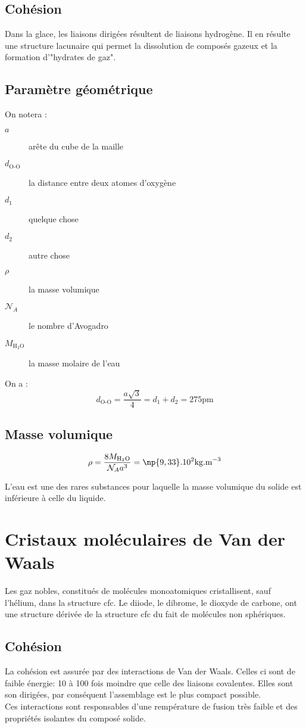 \subsection{Cohésion}
Dans la glace, les liaisons dirigées résultent de liaisons
hydrogène. Il en résulte une structure lacunaire qui permet
la dissolution de composés gazeux et la formation
d’"hydrates de gaz".

\subsection{Paramètre géométrique}
On notera :
\begin{description}
    \item[$a$] arête du cube de la maille
    \item[$d_\text{O-O}$] la distance entre deux atomes
        d'oxygène
    \item[$d_1$] quelque chose
    \item[$d_2$] autre chose
    \item[$\rho$] la masse volumique
    \item[$\mathcal{N}_A$] le nombre d'Avogadro
    \item[$M_{\text{H}_2\text{O}}$] la masse molaire de
        l'eau
\end{description}
On a :
\begin{equation}
    d_\text{O-O} = \frac{a\sqrt{3}}{4} = d_1 + d_2
    = 275\text{pm}
\end{equation}

\subsection{Masse volumique}
\begin{equation}
    \rho = \frac{8M_{\text{H}_2\text{O}}}{\mathcal{N}_A
        a^3} = \np{9,33}.10^2\text{kg.m}^{-3}
\end{equation}
\begin{rem}
    L'eau est une des rares substances pour laquelle la
    masse volumique du solide est inférieure à celle du
    liquide.
\end{rem}

\section{Cristaux moléculaires de Van der Waals}
Les gaz nobles, constitués de molécules monoatomiques
cristallisent, sauf l’hélium, dans la structure cfc.
Le diiode, le dibrome, le dioxyde de carbone, ont
une structure dérivée de la structure cfc du
fait de molécules non sphériques.
\subsection{Cohésion}
La cohésion est assurée par des interactions de
Van der Waals. Celles ci sont de faible énergie:
10 à 100 fois moindre que celle des liaisons covalentes.
Elles sont son dirigées, par conséquent l'assemblage
est le plus compact possible.\\
Ces interactions sont responsables d'une rempérature de
fusion très faible et des propriétés isolantes du composé
solide.
